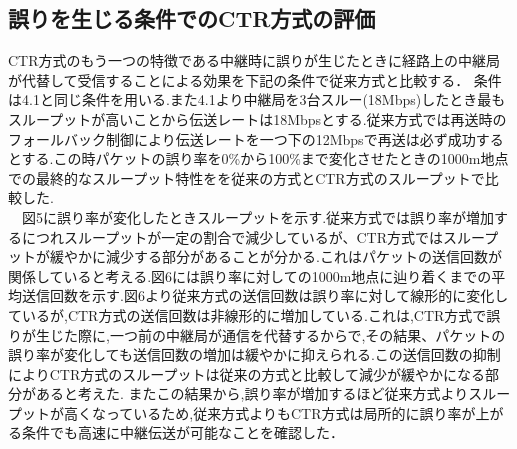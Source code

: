 \documentclass[a4paper,10pt]{ltjsarticle}
\begin{document}
\subsection{誤りを生じる条件でのCTR方式の評価}
CTR方式のもう一つの特徴である中継時に誤りが生じたときに経路上の中継局が代替して受信することによる効果を下記の条件で従来方式と比較する．
条件は4.1と同じ条件を用いる.また4.1より中継局を3台スルー(18Mbps)したとき最もスループットが高いことから伝送レートは18Mbpsとする.従来方式では再送時のフォールバック制御により伝送レートを一つ下の12Mbpsで再送は必ず成功するとする.この時パケットの誤り率を0\%から100\%まで変化させたときの1000m地点での最終的なスループット特性をを従来の方式とCTR方式のスループットで比較した.
\\　図5に誤り率が変化したときスループットを示す.従来方式では誤り率が増加するにつれスループットが一定の割合で減少しているが、CTR方式ではスループットが緩やかに減少する部分があることが分かる.これはパケットの送信回数が関係していると考える.図6には誤り率に対しての1000m地点に辿り着くまでの平均送信回数を示す.図6より従来方式の送信回数は誤り率に対して線形的に変化しているが,CTR方式の送信回数は非線形的に増加している.これは,CTR方式で誤りが生じた際に,一つ前の中継局が通信を代替するからで,その結果、パケットの誤り率が変化しても送信回数の増加は緩やかに抑えられる.この送信回数の抑制によりCTR方式のスループットは従来の方式と比較して減少が緩やかになる部分があると考えた. またこの結果から,誤り率が増加するほど従来方式よりスループットが高くなっているため,従来方式よりもCTR方式は局所的に誤り率が上がる条件でも高速に中継伝送が可能なことを確認した．
\end{document}
